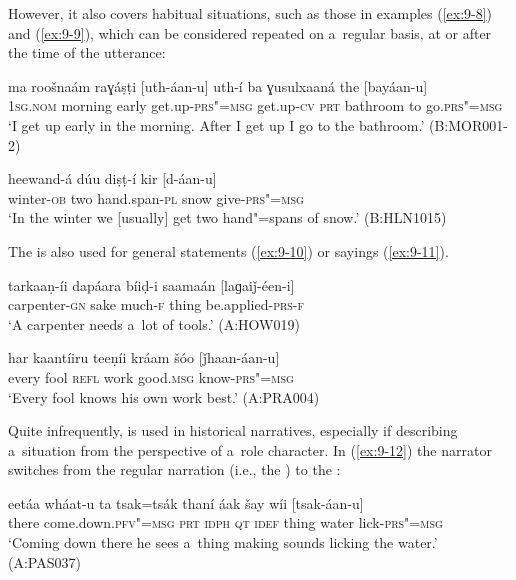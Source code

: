 However, it also covers habitual situations, such as those in examples (\ref{ex:9-8}) and (\ref{ex:9-9}), which can be considered repeated on a~regular basis, at or after the time of the utterance: 

\begin{exe}
\ex
\label{ex:9-8}
\gll ma roošnaám raɣáṣṭi [uth-áan-u] uth-í ba ɣusulxaaná the [bayáan-u] \\
\textsc{1sg.nom} morning early get.up-\textsc{prs"=msg} get.up-\textsc{cv}  \textsc{prt} bathroom to go.\textsc{prs"=msg} \\
\glt `I get up early in the morning. After I get up I go to the bathroom.' (B:MOR001-2)

\ex
\label{ex:9-9}
\gll heewand-á dúu diṣṭ-í kir [d-áan-u] \\
winter-\textsc{ob} two hand.span-\textsc{pl} snow give-\textsc{prs"=msg} \\
\glt `In the winter we [usually] get two hand"=spans of snow.' (B:HLN1015)
\end{exe}

The  is also used for general statements (\ref{ex:9-10}) or sayings (\ref{ex:9-11}).

\begin{exe}
\ex
\label{ex:9-10}
\gll tarkaaṇ-íi dapáara bíiḍ-i saamaán [laɡaiǰ-éen-i]  \\
carpenter-\textsc{gn} sake much-\textsc{f} thing be.applied-\textsc{prs-f} \\
\glt `A carpenter needs a~lot of tools.' (A:HOW019)

\ex
\label{ex:9-11}
\gll har kaantíiru teeṇíi kráam šóo [ǰhaan-áan-u] \\
every fool \textsc{refl} work good.\textsc{msg} know-\textsc{prs"=msg} \\
\glt `Every fool knows his own work best.' (A:PRA004)
\end{exe}

Quite infrequently,  is used in historical narratives, especially if describing a~situation from the perspective of a~role character. In (\ref{ex:9-12}) the narrator switches from the regular narration  (i.e., the ) to the :

\begin{exe}
\ex
\label{ex:9-12}
\gll eetáa wháat-u ta tsak=tsák thaní áak šay wíi [tsak-áan-u] \\
there come.down.\textsc{pfv"=msg} \textsc{prt} \textsc{idph} \textsc{qt} \textsc{idef}  thing water lick-\textsc{prs"=msg}\\
\glt `Coming down there he sees a~thing making sounds licking the water.' (A:PAS037)
\end{exe}


